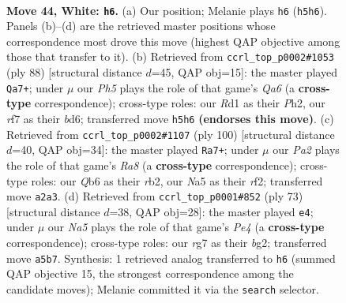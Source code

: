 \documentclass[11pt]{article}
\begin{document}
\clearpage

\begin{figure}[p]\centering
\begin{subfigure}{0.46\textwidth}\centering
\resizebox{\linewidth}{!}{%
\newchessgame
\chessboard[
  setfen={7k/5rrp/1Q6/Np5P/6P1/8/PP3P1K/3R4 w - - 5 44},
  showmover=false,
  pgfstyle=straightmove, color=movearrow, markmove={h5-h6}
]}
\caption{}
\end{subfigure}\hfill
\begin{subfigure}{0.46\textwidth}\centering
\resizebox{\linewidth}{!}{%
\newchessgame
\chessboard[
  setfen={1r6/3k4/QP1b4/P3r2p/8/2P1p1P1/4K2P/8 w - - 0 45},
  showmover=false,
  pgfstyle=straightmove, color=movearrow, markmove={a6-a7}
]}
\caption{}
\end{subfigure}
\\[4pt]
\begin{subfigure}{0.46\textwidth}\centering
\resizebox{\linewidth}{!}{%
\newchessgame
\chessboard[
  setfen={R7/7k/1P1N3p/3P3P/6P1/1P6/Pr3r2/3K4 w - - 5 51},
  showmover=false,
  pgfstyle=straightmove, color=movearrow, markmove={a8-a7}
]}
\caption{}
\end{subfigure}\hfill
\begin{subfigure}{0.46\textwidth}\centering
\resizebox{\linewidth}{!}{%
\newchessgame
\chessboard[
  setfen={7k/7p/6p1/3pp3/1R6/P3q3/1R2P1BK/8 b - - 0 37},
  showmover=false,
  pgfstyle=straightmove, color=movearrow, markmove={e5-e4}
]}
\caption{}
\end{subfigure}
\caption{\textbf{Move 44, White: \texttt{h6}.} (a) Our position; Melanie plays \texttt{h6} (\texttt{h5h6}). Panels (b)--(d) are the retrieved master positions whose correspondence most drove this move (highest QAP objective among those that transfer to it). (b) Retrieved from \texttt{ccrl\_top\_p0002\#1053} (ply 88) [structural distance $d$=45, QAP obj=15]: the master played \texttt{Qa7+}; under $\mu$ our \emph{Ph5} plays the role of that game's \emph{Qa6} (a \textbf{cross-type} correspondence); cross-type roles: our \emph{R}d1 as their \emph{P}h2, our \emph{r}f7 as their \emph{b}d6; transferred move \texttt{h5h6} \textbf{(endorses this move)}. (c) Retrieved from \texttt{ccrl\_top\_p0002\#1107} (ply 100) [structural distance $d$=40, QAP obj=34]: the master played \texttt{Ra7+}; under $\mu$ our \emph{Pa2} plays the role of that game's \emph{Ra8} (a \textbf{cross-type} correspondence); cross-type roles: our \emph{Q}b6 as their \emph{r}b2, our \emph{N}a5 as their \emph{r}f2; transferred move \texttt{a2a3}. (d) Retrieved from \texttt{ccrl\_top\_p0001\#852} (ply 73) [structural distance $d$=38, QAP obj=28]: the master played \texttt{e4}; under $\mu$ our \emph{Na5} plays the role of that game's \emph{Pe4} (a \textbf{cross-type} correspondence); cross-type roles: our \emph{r}g7 as their \emph{b}g2; transferred move \texttt{a5b7}. Synthesis: 1 retrieved analog transferred to \texttt{h6} (summed QAP objective 15, the strongest correspondence among the candidate moves); Melanie committed it via the \texttt{search} selector.}
\label{fig:thought-m86}
\end{figure}
\end{document}

